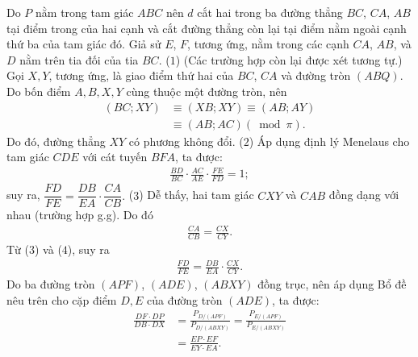 \begin{multicols}{2}
\begin{figure}[H]
		\vspace*{-10pt}
	\end{figure}
	Do $P$ nằm trong tam giác $ABC$ nên $d$ cắt hai trong ba đường thẳng $BC$, $CA$, $AB$ tại điểm trong của hai cạnh và cắt đường thẳng còn lại tại điểm nằm ngoài cạnh thứ ba của tam giác đó.
	\vskip 0.05cm
	Giả sử $E$, $F$, tương ứng, nằm trong các cạnh $CA$, $AB$, và $D$ nằm trên tia đối của tia $BC$.  \hfill                     ($1$)
	\vskip 0.05cm
	(Các trường hợp còn lại được xét tương tự.)
	\vskip 0.1cm
	Gọi $X, Y$, tương ứng, là giao điểm thứ hai của $BC$, $CA$ và đường tròn $(ABQ)$.
	\vskip 0.05cm
	Do bốn điểm $A, B, X, Y$ cùng thuộc một đường tròn, nên
	\begin{align*}
		\left( {BC;XY} \right) &\equiv \left( {XB;XY} \right) \equiv \left( {AB;AY} \right) \\
		&\equiv \left( {AB;AC} \right)\left( {\bmod \pi } \right).
	\end{align*}
	Do đó, đường thẳng $XY$ có phương không đổi.           \hfill ($2$)
	\vskip 0.05cm
	Áp dụng định lý Menelaus cho tam giác $CDE$ với cát tuyến $BFA$, ta được:
	\begin{align*}
		\frac{{BD}}{{BC}} \cdot \frac{{AC}}{{AE}} \cdot \frac{{FE}}{{FD}} = 1;
	\end{align*}
	suy ra, $\dfrac{{FD}}{{FE}} = \dfrac{{DB}}{{EA}} \cdot \dfrac{{CA}}{{CB}}.$ \hfill ($3$)
	\vskip 0.05cm
	Dễ thấy, hai tam giác $CXY$ và $CAB$ đồng dạng với nhau (trường hợp g.g). Do đó
	\begin{align*}
		\frac{{CA}}{{CB}} = \frac{{CX}}{{CY}}. \tag{$4$}
	\end{align*}
	Từ ($3$) và ($4$), suy ra
	\begin{align*}
		\frac{{FD}}{{FE}} = \frac{{DB}}{{EA}} \cdot \frac{{CX}}{{CY}}. \tag{$5$}
	\end{align*}
	Do ba đường tròn $(APF)$, $(ADE)$, $(ABXY)$ đồng trục, nên áp dụng Bổ đề nêu trên cho cặp điểm $D, E$ của đường tròn $(ADE)$, ta được:
	\begin{align*}
		\frac{{DF \cdot DP}}{{DB \cdot DX}} &= \frac{{{P_{D/\left( {APF} \right)}}}}{{{P_{D/\left( {ABXY} \right)}}}} = \frac{{{P_{E/\left( {APF} \right)}}}}{{{P_{E/\left( {ABXY} \right)}}}} \\
		&= \frac{{EP \cdot EF}}{{EY \cdot EA}}.

\end{align*}
\end{multicols}
